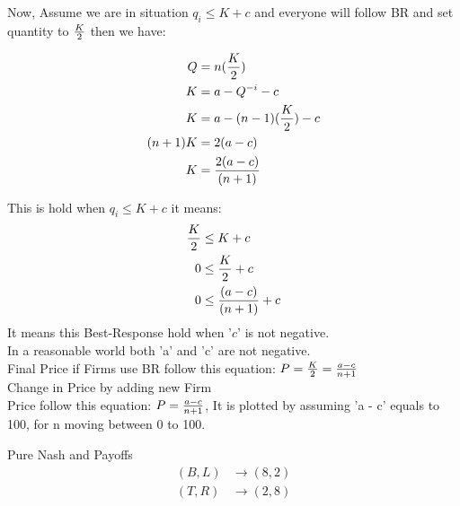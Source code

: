 \documentclass[
  course = {{IE579 Game Theory and Multi-Agent Reinforcement Learning}},
  assignment = 1,
  name = {{Mohammad Mahdi Rahimi}},
  studentnumber = {{20208244}},
  email = {{mahi@kaist.ac.kr}},
  firstexercise = 1
]{aga-homework}
\begin{document}
Now, Assume we are in situation $q_i \le K + c$ and everyone will follow BR and set quantity to $K \over 2$ then we have:

\begin{equation} \label{eq1}
\begin{split}
Q & = n({K \over 2}) \\
K & = a - Q^{-i} - c\\
K & = a - (n - 1)({K \over 2}) - c\\
(n+1)K & = 2(a - c)\\
K & = {2(a - c) \over (n + 1)}\\
\end{split}
\end{equation}

This is hold when $q_i \le K + c$ it means:
\begin{equation} \label{eq1}
\begin{split}
{K \over 2} & \le K + c\\
0 & \le {K \over 2} + c\\
0 & \le {(a - c) \over (n + 1)} + c
\end{split}
\end{equation}
It means this Best-Response hold when '$c$' is not negative.\\
In a reasonable world both 'a' and 'c' are not negative.\\
Final Price if Firms use BR follow this equation: $P = {K \over 2} = {a - c \over n + 1}$\\

\subexercise Change in Price by adding new Firm\\

Price follow this equation: $P = {a - c \over n + 1}$, It is plotted by assuming 'a - c' equals to 100, for n moving between 0 to 100.

\begin{center}
\end{center}

\exercise
\subexercise Pure Nash and Payoffs
\\
\begin{equation} \label{eq1}
\begin{split}
(B, L) & \rightarrow (8, 2)\\
(T, R) & \rightarrow (2, 8)
\end{split}
\end{equation}
\end{document}
